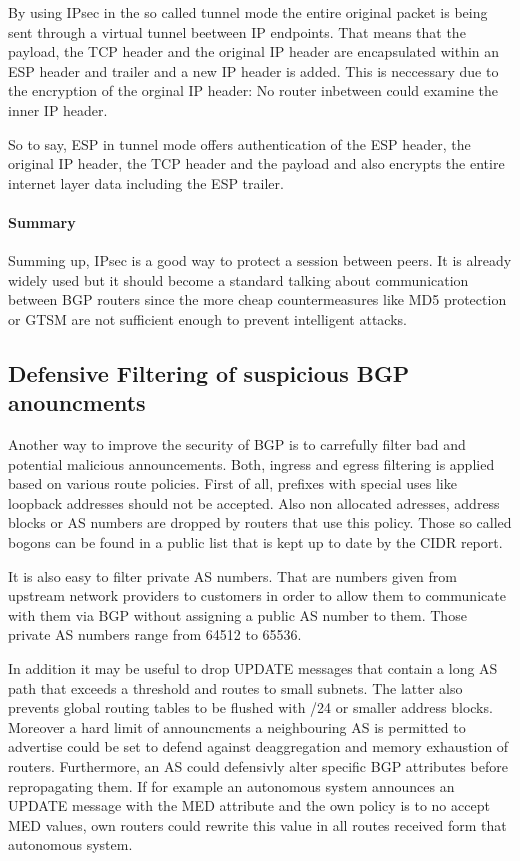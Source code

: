 \documentclass[12pt,a4paper]{IEEEtran}
\begin{document}
		By using IPsec in the so called tunnel mode the entire original packet is being sent through a virtual tunnel beetween IP endpoints. That means that the payload, the TCP header and the original IP header are encapsulated within an ESP header and trailer and a new IP header is added. This is neccessary due to the encryption of the orginal IP header: No router inbetween could examine the inner IP header. 
		
		So to say, ESP in tunnel mode offers authentication of the ESP header, the original IP header, the TCP header and the payload and also encrypts the entire internet layer data including the ESP trailer. 


		\paragraph{Summary} Summing up, IPsec is a good way to protect a session between peers. It is already widely used but it should become a standard talking about  communication between BGP routers since the more cheap countermeasures like MD5 protection or GTSM are not sufficient enough to prevent intelligent attacks.


       \subsection{Defensive Filtering of suspicious BGP anouncments}

		Another way to improve the security of BGP is to carrefully filter bad and potential malicious announcements.
		Both, ingress and egress filtering is applied based on various route policies.
		First of all, prefixes with special uses like loopback addresses should not be accepted. 
		Also non allocated adresses, address blocks or AS numbers are dropped by routers that use this policy. Those so called bogons can be found in a public list that is kept up to date by the CIDR report. %

		It is also easy to filter private AS numbers. That are numbers given from upstream network providers to customers in order to allow them to communicate with them via BGP without assigning a public AS number to them. Those private AS numbers range from 64512 to 65536.

		In addition it may be useful to drop UPDATE messages that contain a long AS path that exceeds a threshold and routes to small subnets. The latter also prevents global routing tables to be flushed with /24 or smaller address blocks. 
		Moreover a hard limit of announcments a neighbouring AS is permitted to advertise could be set to defend against deaggregation and memory exhaustion of routers.
		Furthermore, an AS could defensivly alter specific BGP attributes before repropagating them. If for example an autonomous system  announces an UPDATE message with the MED attribute and the own policy is to no accept MED values, own routers could rewrite this value in all routes received form that autonomous system.
		
\end{document}
